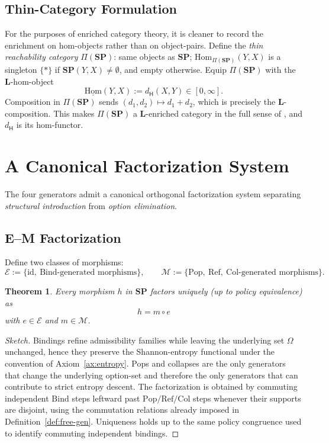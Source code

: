 \documentclass[12pt,a4paper]{article}
\newtheorem{theorem}{Theorem}[section]
\theoremstyle{definition}
\theoremstyle{remark}
\newcommand{\Ent}{\ensuremath{\mathsf{H}}}
\newcommand{\SP}{\mathbf{SP}}
\providecommand{\Hom}{\mathrm{Hom}}
\renewcommand{\Hom}{\mathrm{Hom}}
\providecommand{\id}{\mathrm{id}}
\renewcommand{\id}{\mathrm{id}}
\newcommand{\Pop}{\ensuremath{\mathrm{Pop}}}
\newcommand{\RefOp}{\ensuremath{\mathrm{Ref}}}
\newcommand{\Bind}{\ensuremath{\mathrm{Bind}}}
\newcommand{\Col}{\ensuremath{\mathrm{Col}}}
\begin{document}
\subsection{Thin-Category Formulation}

For the purposes of enriched category theory, it is cleaner to record the
enrichment on hom-objects rather than on object-pairs. Define the
\emph{thin reachability category} $\Pi(\SP)$: same objects as $\SP$;
$\Hom_{\Pi(\SP)}(Y,X)$ is a singleton $\{\ast\}$ if $\SP(Y,X)\ne\emptyset$,
and empty otherwise. Equip $\Pi(\SP)$ with the $\mathbf{L}$-hom-object
\[
  \underline{\mathrm{Hom}}(Y,X):=d_{\Ent}(X,Y)\in[0,\infty].
\]
Composition in $\Pi(\SP)$ sends $(d_1,d_2)\mapsto d_1+d_2$, which is
precisely the $\mathbf{L}$-composition. This makes $\Pi(\SP)$ a
$\mathbf{L}$-enriched category in the full sense of \citet{awodey2010},
and $d_{\Ent}$ is its hom-functor.

\section{A Canonical Factorization System} \label{sec:factorization}

The four generators admit a canonical orthogonal factorization system separating \emph{structural introduction} from \emph{option elimination}.

\subsection{E--M Factorization}

Define two classes of morphisms:
\[
\mathcal{E} := \{\id,\ \Bind\text{-generated morphisms}\},
\qquad
\mathcal{M} := \{\Pop,\ \RefOp,\ \Col\text{-generated morphisms}\}.
\]

\begin{theorem}
Every morphism $h$ in $\SP$ factors uniquely (up to policy equivalence) as
\[
h = m \circ e
\]
with $e\in\mathcal{E}$ and $m\in\mathcal{M}$.
\end{theorem}

\begin{proof}[Sketch]
Bindings refine admissibility families while leaving the underlying set $\Omega$ unchanged, hence they preserve the Shannon-entropy functional under the convention of Axiom~\ref{ax:entropy}. Pops and collapses are the only generators that change the underlying option-set and therefore the only generators that can contribute to strict entropy descent. The factorization is obtained by commuting independent $\Bind$ steps leftward past $\Pop/\RefOp/\Col$ steps whenever their supports are disjoint, using the commutation relations already imposed in Definition~\ref{def:free-gen}. Uniqueness holds up to the same policy congruence used to identify commuting independent bindings.
\end{proof}
\end{document}
